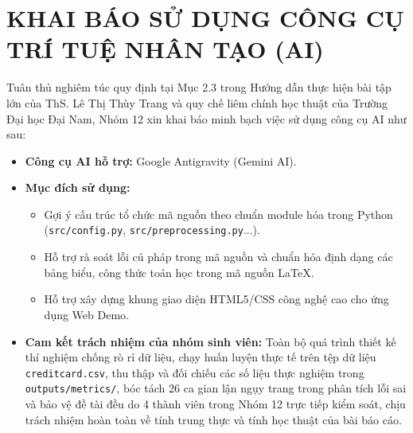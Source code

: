 \documentclass[13pt,a4paper]{extarticle}
\begin{document}
\section{KHAI BÁO SỬ DỤNG CÔNG CỤ TRÍ TUỆ NHÂN TẠO (AI)}
Tuân thủ nghiêm túc quy định tại Mục 2.3 trong Hướng dẫn thực hiện bài tập lớn của ThS. Lê Thị Thùy Trang và quy chế liêm chính học thuật của Trường Đại học Đại Nam, Nhóm 12 xin khai báo minh bạch việc sử dụng công cụ AI như sau:
\begin{itemize}
    \item \textbf{Công cụ AI hỗ trợ:} Google Antigravity (Gemini AI).
    \item \textbf{Mục đích sử dụng:}
    \begin{itemize}
        \item Gợi ý cấu trúc tổ chức mã nguồn theo chuẩn module hóa trong Python (\texttt{src/config.py}, \texttt{src/preprocessing.py}...).
        \item Hỗ trợ rà soát lỗi cú pháp trong mã nguồn và chuẩn hóa định dạng các bảng biểu, công thức toán học trong mã nguồn \LaTeX.
        \item Hỗ trợ xây dựng khung giao diện HTML5/CSS công nghệ cao cho ứng dụng Web Demo.
    \end{itemize}
    \item \textbf{Cam kết trách nhiệm của nhóm sinh viên:} Toàn bộ quá trình thiết kế thí nghiệm chống rò rỉ dữ liệu, chạy huấn luyện thực tế trên tệp dữ liệu \texttt{creditcard.csv}, thu thập và đối chiếu các số liệu thực nghiệm trong \texttt{outputs/metrics/}, bóc tách 26 ca gian lận ngụy trang trong phân tích lỗi sai và bảo vệ đề tài đều do 4 thành viên trong Nhóm 12 trực tiếp kiểm soát, chịu trách nhiệm hoàn toàn về tính trung thực và tính học thuật của bài báo cáo.
\end{itemize}
\end{document}
